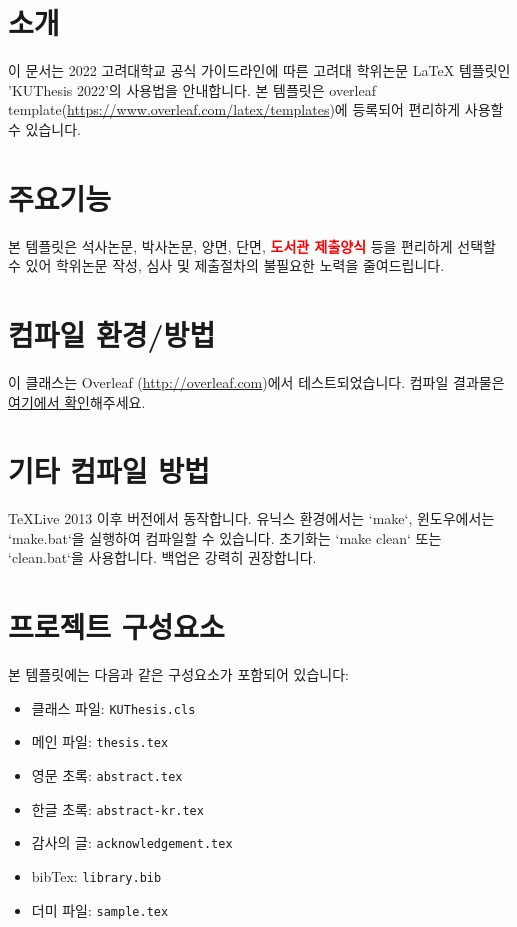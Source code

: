 

\section{소개}
이 문서는 2022 고려대학교 공식 가이드라인에 따른 고려대 학위논문 LaTeX 템플릿인 'KUThesis 2022'의 사용법을 안내합니다. 본 템플릿은 overleaf template(\url{https://www.overleaf.com/latex/templates})에 등록되어 편리하게 사용할 수 있습니다. 

\section{주요기능}
본 템플릿은 석사논문, 박사논문, 양면, 단면, \textbf{ \textcolor{red}{도서관 제출양식} } 등을 편리하게 선택할 수 있어 학위논문 작성, 심사 및 제출절차의 불필요한 노력을 줄여드립니다.


\section{컴파일 환경/방법}
이 클래스는 Overleaf (\url{http://overleaf.com})에서 테스트되었습니다. 컴파일 결과물은 \href{Korea_University_Thesis_Template.pdf}{여기에서 확인}해주세요.

\section{기타 컴파일 방법}
TeXLive 2013 이후 버전에서 동작합니다. 유닉스 환경에서는 `make`, 윈도우에서는 `make.bat`을 실행하여 컴파일할 수 있습니다. 초기화는 `make clean` 또는 `clean.bat`을 사용합니다. 백업은 강력히 권장합니다.


\section{프로젝트 구성요소}
본 템플릿에는 다음과 같은 구성요소가 포함되어 있습니다:
\begin{itemize}
  \item 클래스 파일: \texttt{KUThesis.cls}
  \item 메인 파일: \texttt{thesis.tex}
  \item 영문 초록: \texttt{abstract.tex}
  \item 한글 초록: \texttt{abstract-kr.tex}
  \item 감사의 글: \texttt{acknowledgement.tex}
  \item bibTex: \texttt{library.bib}
  \item 더미 파일: \texttt{sample.tex}
\end{itemize}

